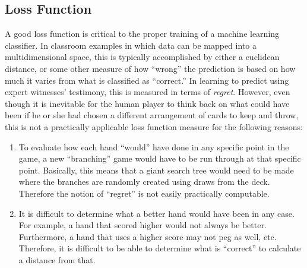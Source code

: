 
\subsection{Loss Function}
\label{sec:dm-methods-loss}


A good loss function is critical to the proper training of a machine learning
classifier.
%
In classroom examples in which data can be mapped into a multidimensional
space,
this is typically accomplished by either a euclidean distance, or some other
measure of how ``wrong'' the prediction is based on how much it varies from what
is classified as ``correct.''
%
In learning to predict using expert witnesses' testimony,
this is measured in terms of \textit{regret}.
%
However, even though it is inevitable for the human player to think back on what
could have been if he or she had chosen a different arrangement of cards to keep
and throw, this is not a practically applicable loss function measure for the
following reasons:
%
\begin{enumerate}
\item To evaluate how each hand ``would'' have done in any specific point in the
	game, a new ``branching'' game would have to be run through at that specific
	point. Basically, this means that a giant search tree would need to be made
	where the branches are randomly created using draws from the deck.
	Therefore the notion of ``regret'' is not easily practically computable.

\item It is difficult to determine what a better hand would have been in any
	case.
	For example, a hand that scored higher would not always be better.
	Furthermore, a hand that uses a higher score may not peg as well, etc.
	Therefore, it is difficult to be able to determine what is ``correct'' to
	calculate a distance from that.
\end{enumerate}
%

